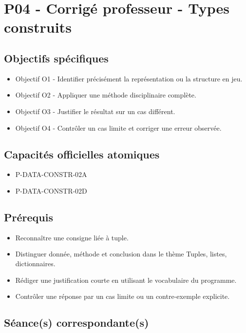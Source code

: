 \section{P04 - Corrigé professeur - Types construits}

\subsection{Objectifs spécifiques}

\begin{itemize}
\tightlist
\item
  Objectif O1 - Identifier précisément la représentation ou la structure
  en jeu.
\item
  Objectif O2 - Appliquer une méthode disciplinaire complète.
\item
  Objectif O3 - Justifier le résultat sur un cas différent.
\item
  Objectif O4 - Contrôler un cas limite et corriger une erreur observée.
\end{itemize}

\subsection{Capacités officielles atomiques}

\begin{itemize}
\tightlist
\item
  P-DATA-CONSTR-02A
\item
  P-DATA-CONSTR-02D
\end{itemize}

\subsection{Prérequis}

\begin{itemize}
\tightlist
\item
  Reconnaître une consigne liée à tuple.
\item
  Distinguer donnée, méthode et conclusion dans le thème Tuples, listes,
  dictionnaires.
\item
  Rédiger une justification courte en utilisant le vocabulaire du
  programme.
\item
  Contrôler une réponse par un cas limite ou un contre-exemple
  explicite.
\end{itemize}

\subsection{Séance(s) correspondante(s)}

